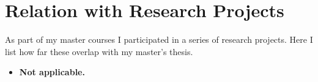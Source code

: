 
\chapter{Relation with Research Projects}
\label{ch:relation_research_project}

As part of my master courses I participated in a series of research projects.
Here I list how far these overlap with my master's thesis.

\begin{itemize}
  \item \textbf{Not applicable.}
\end{itemize}
